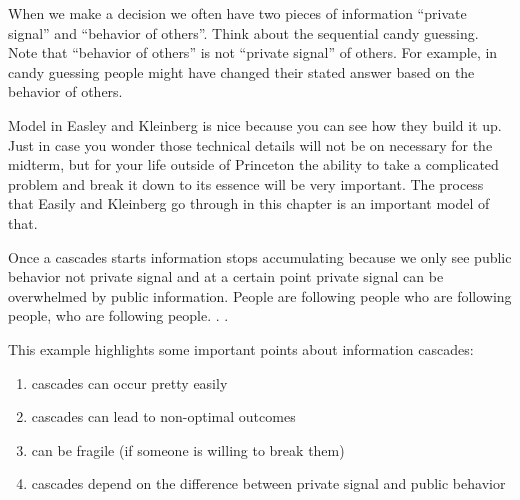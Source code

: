 \documentclass[aspectratio=169]{beamer}
\begin{document}
\begin{frame}
{When we make a decision we often have two pieces of information ``private signal'' and ``behavior of others''.  Think about the sequential candy guessing.  Note that ``behavior of others'' is not ``private signal'' of others.  For example, in candy guessing people might have changed their stated answer based on the behavior of others.

Model in Easley and Kleinberg is nice because you can see how they build it up.  Just in case you wonder those technical details will not be on necessary for the midterm, but for your life outside of Princeton the ability to take a complicated problem and break it down to its essence will be very important.  The process that Easily and Kleinberg go through in this chapter is an important model of that.

Once a cascades starts information stops accumulating because we only see public behavior not private signal and at a certain point private signal can be overwhelmed by public information.  People are following people who are following people, who are following people. . . 
}

\end{frame}
\begin{frame}

This example highlights some important points about information cascades:
\begin{enumerate}
\item cascades can occur pretty easily 
\pause
\item cascades can lead to non-optimal outcomes
\pause
\item can be fragile (if someone is willing to break them)
\pause
\item cascades depend on the difference between private signal and public behavior
\end{enumerate}

\end{frame}
\end{document}
